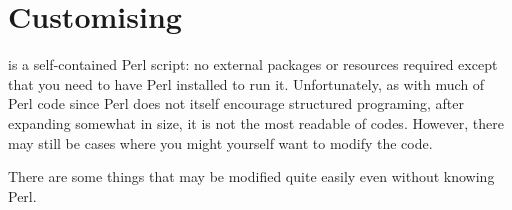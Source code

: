 \documentclass{article}
\begin{document}

\section{Customising \TeXcount{}}

\TeXcount{} is a self-contained Perl script: no external packages or resources required except that you need to have Perl installed to run it. Unfortunately, as with much of Perl code since Perl does not itself encourage structured programing, after expanding somewhat in size, it is not the most readable of codes. However, there may still be cases where you might yourself want to modify the code.

There are some things that may be modified quite easily even without knowing Perl.
\end{document}
